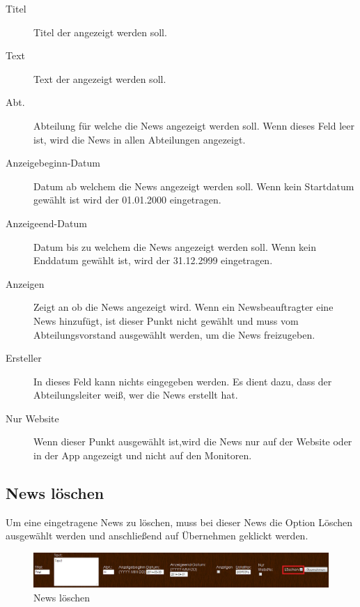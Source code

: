 \begin{description} 
\item[Titel] Titel der angezeigt werden soll.
\item[Text] Text der angezeigt werden soll.
\item[Abt.] Abteilung für welche die News angezeigt werden soll. Wenn dieses Feld leer ist, wird die News in allen Abteilungen angezeigt.
\item[Anzeigebeginn-Datum] Datum ab welchem die News angezeigt werden soll. Wenn kein Startdatum gewählt ist wird der 01.01.2000 eingetragen.
\item[Anzeigeend-Datum] Datum bis zu welchem die News angezeigt werden soll. Wenn kein Enddatum gewählt ist, wird der 31.12.2999 eingetragen. 
\item[Anzeigen] Zeigt an ob die News angezeigt wird. Wenn ein Newsbeauftragter eine News hinzufügt, ist dieser Punkt nicht gewählt und muss vom Abteilungsvorstand ausgewählt werden, um die News freizugeben. 
\item[Ersteller] In dieses Feld kann nichts eingegeben werden. Es dient dazu, dass der Abteilungsleiter weiß, wer die News erstellt hat.
\item[Nur Website] Wenn dieser Punkt ausgewählt ist,wird die News nur auf der Website oder in der App angezeigt und nicht auf den Monitoren.
\end{description}

\subsection{News löschen}

Um eine eingetragene News zu löschen, muss bei dieser News die Option Löschen ausgewählt werden und anschließend auf Übernehmen geklickt werden. 

\begin{figure}[H]
\centering
\includegraphics[keepaspectratio=true, width=16cm]{images/screenshots/news_deleting.png}
\caption{News löschen}
\label{fig:instr_admin_news_delete}
\end{figure}